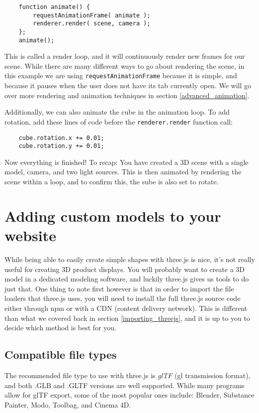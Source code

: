\documentclass[10pt,final,journal,compsoc]{IEEEtran}
\begin{document}
        \begin{lstlisting}
    function animate() {
        requestAnimationFrame( animate );
        renderer.render( scene, camera );
    };
    animate();
        \end{lstlisting}
        
        This is called a render loop, and it will continuously render new frames for our scene. While there are many different ways to go about rendering the scene, in this example we are using \verb|requestAnimationFrame| because it is simple, and because it pauses when the user does not have its tab currently open. We will go over more rendering and animation techniques in section \ref{advanced_animation}.
        
        Additionally, we can also animate the cube in the animation loop. To add rotation, add these lines of code before the \verb|renderer.render| function call:
        
        \begin{lstlisting}
    cube.rotation.x += 0.01;
    cube.rotation.y += 0.01;
        \end{lstlisting}

        Now everything is finished! To recap: You have created a 3D scene with a single model, camera, and two light sources. This is then animated by rendering the scene within a loop, and to confirm this, the sube is also set to rotate.



\section{Adding custom models to your website}
While being able to easily create simple shapes with three.js is nice, it's not really useful for creating 3D product displays. You will probably want to create a 3D model in a dedicated modeling software, and luckily three.js gives us tools to do just that. One thing to note first however is that in order to import the file loaders that three.js uses, you will need to install the full three.js source code either through npm or with a CDN (content delivery network). This is different than what we covered back in section \ref{importing_threejs}, and it is up to you to decide which method is best for you.

    \subsection{Compatible file types} \label{compatible_file_types}
    The recommended file type to use with three.js is \textit{glTF} (gl transmission format), and both .GLB and .GLTF versions are well supported. While many programs allow for glTF export, some of the most popular ones include: Blender, Substance Painter, Modo, Toolbag, and Cinema 4D.
    
\end{document}
